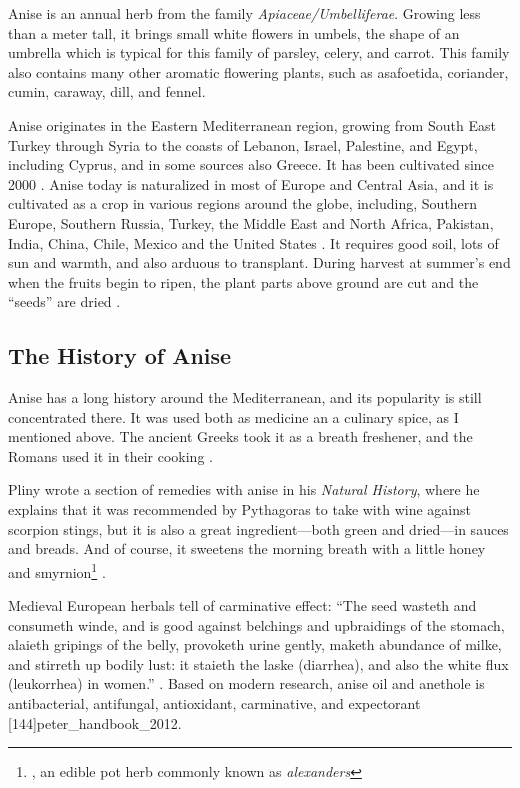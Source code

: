 Anise is an annual herb from the family \textit{Apiaceae/Umbelliferae}. Growing less than a meter tall, it brings small white flowers in umbels, the shape of an umbrella which is typical for this family of parsley, celery, and carrot. This family also contains many other aromatic flowering plants, such as asa\-foetida, coriander, cumin, caraway, dill, and fennel.

Anise originates in the Eastern Mediterranean region, growing from South East Turkey through Syria to the coasts of Lebanon, Israel, Palestine, and Egypt, including Cyprus, and in some sources also Greece. It has been cultivated since 2000 \BC{} \autocite[718]{mabberley_mabberleys_2017}.
Anise today is naturalized in most of Europe and Central Asia, and it is cultivated as a crop in various regions around the globe, including, Southern Europe, Southern Russia, Turkey, the Middle East and North Africa, Pakistan, India, China, Chile, Mexico and the United States \autocite[32]{farrell_spices_1985}. It requires good soil, lots of sun and warmth, and also arduous to transplant. During harvest at summer's end when the fruits begin to ripen, the plant parts above ground are cut and the ``seeds'' are dried \autocite[212]{van_wyk_culinary_2014}.

\subsection{The History of Anise}

Anise has a long history around the Mediterranean, and its popularity is still concentrated there. It was used both as medicine an a culinary spice, as I mentioned above. The ancient Greeks took it as a breath freshener, and the Romans used it in their cooking \autocite{farrell_spices_1985}.

Pliny wrote a section of remedies with anise in his \textit{Natural History}, where he explains that it was recommended by Pythagoras to take with wine against scorpion stings, but it is also a great ingredient---both green and dried---in sauces and breads. And of course, it sweetens the morning breath with a little honey and smyrnion\footnote{, an edible pot herb commonly known as \textit{alexanders}} \autocite[20:72 ]{pliny_the_elder_natural_1855}.

Medieval European herbals tell of carminative effect: ``The seed wasteth and consumeth winde, and is good against belchings and upbraidings of the stomach, alaieth gripings of the belly, provoketh urine gently, maketh abundance of milke, and stirreth up bodily lust: it staieth the laske (diarrhea), and also the white flux (leukorrhea) in women.'' \autocite[880 ]{gerarde_herball_1597}. Based on modern research, anise oil and anethole is antibacterial, antifungal, antioxidant, carminative, and expectorant [144]{peter_handbook_2012}.

